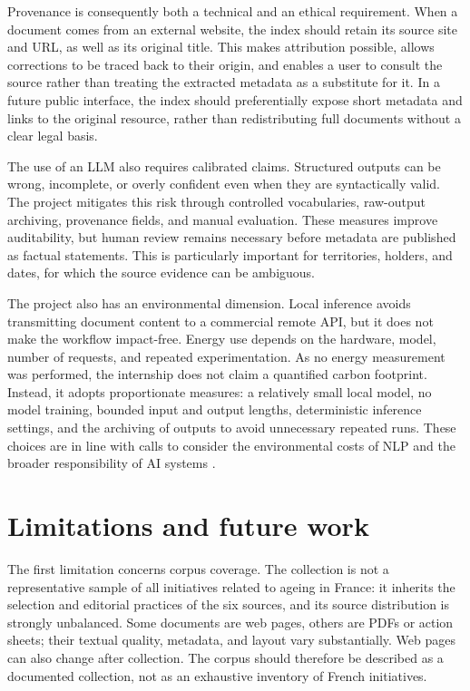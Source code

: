 Provenance is consequently both a technical and an ethical requirement. When a
document comes from an external website, the index should retain its source
site and URL, as well as its original title. This makes attribution possible,
allows corrections to be traced back to their origin, and enables a user to
consult the source rather than treating the extracted metadata as a substitute
for it. In a future public interface, the index should preferentially expose
short metadata and links to the original resource, rather than redistributing
full documents without a clear legal basis.

The use of an LLM also requires calibrated claims. Structured outputs can be
wrong, incomplete, or overly confident even when they are syntactically valid.
The project mitigates this risk through controlled vocabularies, raw-output
archiving, provenance fields, and manual evaluation. These measures improve
auditability, but human review remains necessary before metadata are published
as factual statements. This is particularly important for territories, holders,
and dates, for which the source evidence can be ambiguous.

The project also has an environmental dimension. Local inference avoids
transmitting document content to a commercial remote API, but it does not make
the workflow impact-free. Energy use depends on the hardware, model, number of
requests, and repeated experimentation. As no energy measurement was performed,
the internship does not claim a quantified carbon footprint. Instead, it adopts
proportionate measures: a relatively small local model, no model training,
bounded input and output lengths, deterministic inference settings, and the
archiving of outputs to avoid unnecessary repeated runs. These choices are in
line with calls to consider the environmental costs of NLP and the broader
responsibility of AI systems \cite{strubell2019energy, unesco2021recommendation}.

\section{Limitations and future work}

The first limitation concerns corpus coverage. The collection is not a
representative sample of all initiatives related to ageing in France: it
inherits the selection and editorial practices of the six sources, and its
source distribution is strongly unbalanced. Some documents are web pages,
others are PDFs or action sheets; their textual quality, metadata, and layout
vary substantially. Web pages can also change after collection. The corpus
should therefore be described as a documented collection, not as an exhaustive
inventory of French initiatives.

